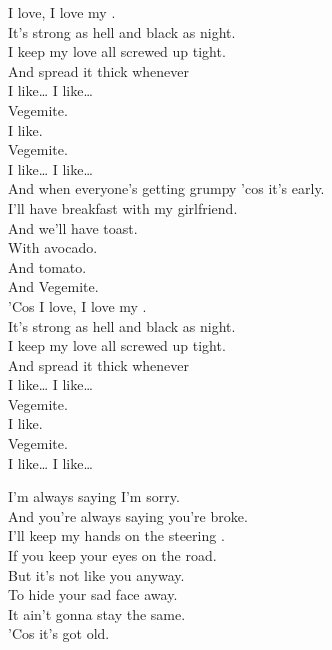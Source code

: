 I love, I love my . \\
It's strong as hell and black as night. \\
I keep my love all screwed up tight. \\
And spread it thick whenever \\
I like… I like… \\

Vegemite. \\
I like. \\
Vegemite. \\
I like… I like… \\

And when everyone's getting grumpy 'cos it's early. \\
I'll have breakfast with my girlfriend. \\
And we'll have toast. \\
With avocado. \\
And tomato. \\
And Vegemite. \\

'Cos I love, I love my . \\
It's strong as hell and black as night. \\
I keep my love all screwed up tight. \\
And spread it thick whenever \\
I like… I like… \\

Vegemite. \\
I like. \\
Vegemite. \\
I like… I like… \\





I'm always saying I'm sorry. \\
And you're always saying you're broke. \\
I'll keep my hands on the steering . \\
If you keep your eyes on the road. \\
But it's not like you anyway. \\
To hide your sad face away. \\
It ain't gonna stay the same. \\
'Cos it's got old. \\


